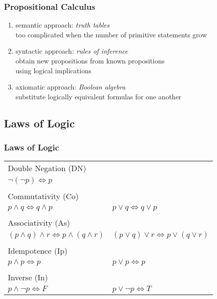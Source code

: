 \documentclass[dvipsnames]{beamer}
\begin{document}
\begin{frame}
  \frametitle{Propositional Calculus}

  \begin{enumerate}
    \item semantic approach: \emph{truth tables}\\
      too complicated when the number of primitive statements grow

    \pause
    \medskip
    \item syntactic approach: \emph{rules of inference}\\
      obtain new propositions from known propositions\\
      using logical implications

    \pause
    \medskip
    \item axiomatic approach: \emph{Boolean algebra}\\
      substitute logically equivalent formulas for one another
  \end{enumerate}
\end{frame}

\subsection{Laws of Logic}

\begin{frame}
  \frametitle{Laws of Logic}

  \begin{tabular}{ll}
  \alert{Double Negation (DN)} &\\
    $\neg (\neg p) \Leftrightarrow p$ &\\\\
  \pause
  \alert{Commutativity (Co)} &\\
    $p \wedge q \Leftrightarrow q \wedge p$ &
    $p \vee q \Leftrightarrow q \vee p$\\\\
  \pause
  \alert{Associativity (As)} &\\
    $(p \wedge q) \wedge r \Leftrightarrow p \wedge (q \wedge r)$ &
    $(p \vee q) \vee r \Leftrightarrow p \vee (q \vee r)$\\\\
  \pause
  \alert{Idempotence (Ip)} &\\
    $p \wedge p \Leftrightarrow p$ &
    $p \vee p \Leftrightarrow p$\\\\
  \pause
  \alert{Inverse (In)} &\\
    $p \wedge \neg p \Leftrightarrow F$ &
    $p \vee \neg p \Leftrightarrow T$
  \end{tabular}
\end{frame}
\end{document}
